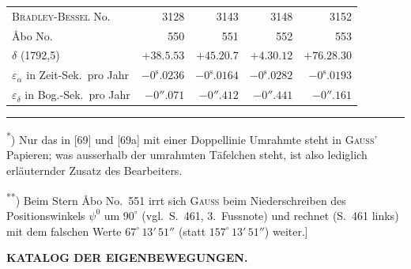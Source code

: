 \documentclass[12pt,a4paper]{article}
\theoremstyle{plain}
\theoremstyle{definition}
\theoremstyle{remark}
\begin{document}
\begin{small}
\begin{center}
\begin{tabular}{|l|r|r|r|r|}
\hline
\textsc{Bradley-Bessel} No. & 3128 & 3143 & 3148 & 3152 \\
\AA bo No. & 550 & 551 & 552 & 553 \\
$\delta$ (1792,5) & $+38.5.53$ & $+45.20.7$ & $+4.30.12$ & $+76.28.30$ \\
$\varepsilon_{\alpha}$ in Zeit-Sek.~pro Jahr & $-0^{\mathrm{s}}\!.0236$ & $-0^{\mathrm{s}}\!.0164$ & $-0^{\mathrm{s}}\!.0282$ & $-0^{\mathrm{s}}\!.0193$ \\
$\varepsilon_{\delta}$ in Bog.-Sek.~pro Jahr & $-0''\!\!.071$ & $-0''\!\!.412$ & $-0''\!\!.441$ & $-0''\!\!.161$ \\
\hline
\end{tabular}
\end{center}
\end{small}

\medskip
\noindent\rule{\textwidth}{0.4pt}
\begin{footnotesize}
\textsuperscript{*}) Nur das in [69] und [69a] mit einer Doppellinie Umrahmte steht in
\textsc{Gau\ss'} Papieren; was ausserhalb der umrahmten T\"afelchen steht, ist also
lediglich erl\"auternder Zusatz des Bearbeiters.

\textsuperscript{**}) Beim Stern \AA bo No.~551 irrt sich \textsc{Gau\ss} beim Niederschreiben des
Positionswinkels $\psi^{0}$ um $90^{\circ}$ (vgl.~S.~461, 3.~Fussnote) und rechnet (S.~461 links)
mit dem falschen Werte $67^{\circ}\,13'\,51''$ (statt $157^{\circ}\,13'\,51''$) weiter.]
\end{footnotesize}

\newpage
\begin{center}
\textbf{KATALOG DER EIGENBEWEGUNGEN.}
\end{center}
\end{document}
